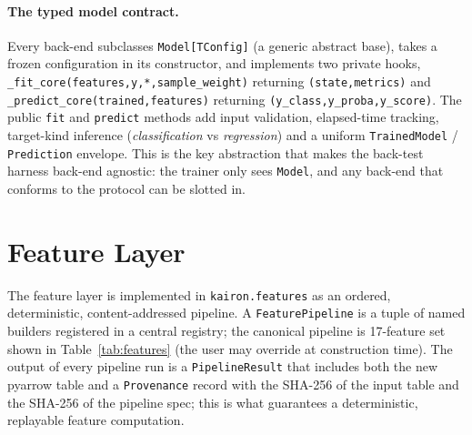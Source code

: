 \documentclass[11pt,a4paper]{article}
\let\oldsection\section
\renewcommand{\section}{\clearpage\oldsection}
\begin{document}
\paragraph{The typed model contract.}
Every back-end subclasses \texttt{Model[TConfig]} (a generic
abstract base), takes a frozen configuration in its constructor,
and implements two private hooks,
\texttt{\_fit\_core(features,\;y,\;*,\;sample\_weight)} returning
\texttt{(state,\;metrics)} and \texttt{\_predict\_core(trained,\;features)}
returning \texttt{(y\_class,\;y\_proba,\;y\_score)}. The public
\texttt{fit} and \texttt{predict} methods add input validation,
elapsed-time tracking, target-kind inference
(\emph{classification} vs \emph{regression}) and a uniform
\texttt{TrainedModel} / \texttt{Prediction} envelope. This is the
key abstraction that makes the back-test harness back-end
agnostic: the trainer only sees \texttt{Model}, and any
back-end that conforms to the protocol can be slotted in.

\section{Feature Layer}\label{sec:feat}

The feature layer is implemented in
\texttt{kairon.features} as an ordered, deterministic,
content-addressed pipeline. A
\texttt{FeaturePipeline} is a tuple of named builders registered
in a central registry; the canonical pipeline is
17-feature set shown in
Table~\ref{tab:features} (the user may override at
construction time). The output of every pipeline run is a
\texttt{PipelineResult} that includes both the new pyarrow table
and a \texttt{Provenance} record with the SHA-256 of the input
table and the SHA-256 of the pipeline spec; this is what
guarantees a deterministic, replayable feature computation.
\end{document}
